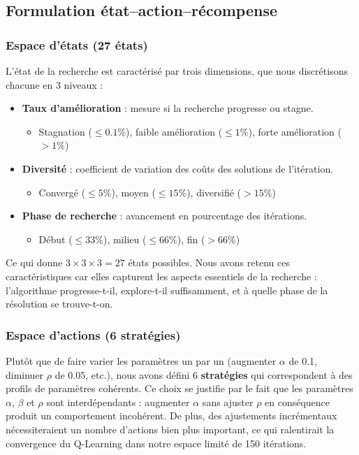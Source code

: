 \documentclass[12pt, a4paper]{article}
\begin{document}
\subsection{Formulation état--action--récompense}

\subsubsection{Espace d'états (27 états)}

L'état de la recherche est caractérisé par trois dimensions, que nous discrétisons chacune en 3 niveaux :

\begin{itemize}
    \item \textbf{Taux d'amélioration} : mesure si la recherche progresse ou stagne.
    \begin{itemize}
        \item Stagnation ($\leq 0.1\%$), faible amélioration ($\leq 1\%$), forte amélioration ($> 1\%$)
    \end{itemize}
    \item \textbf{Diversité} : coefficient de variation des coûts des solutions de l'itération.
    \begin{itemize}
        \item Convergé ($\leq 5\%$), moyen ($\leq 15\%$), diversifié ($> 15\%$)
    \end{itemize}
    \item \textbf{Phase de recherche} : avancement en pourcentage des itérations.
    \begin{itemize}
        \item Début ($\leq 33\%$), milieu ($\leq 66\%$), fin ($> 66\%$)
    \end{itemize}
\end{itemize}

Ce qui donne $3 \times 3 \times 3 = 27$ états possibles. Nous avons retenu ces caractéristiques car elles capturent les aspects essentiels de la recherche : l'algorithme progresse-t-il, explore-t-il suffisamment, et à quelle phase de la résolution se trouve-t-on.

\subsubsection{Espace d'actions (6 stratégies)}

Plutôt que de faire varier les paramètres un par un (augmenter $\alpha$ de 0.1, diminuer $\rho$ de 0.05, etc.), nous avons défini 6 \textbf{stratégies} qui correspondent à des profils de paramètres cohérents. Ce choix se justifie par le fait que les paramètres $\alpha$, $\beta$ et $\rho$ sont interdépendants : augmenter $\alpha$ sans ajuster $\rho$ en conséquence produit un comportement incohérent. De plus, des ajustements incrémentaux nécessiteraient un nombre d'actions bien plus important, ce qui ralentirait la convergence du Q-Learning dans notre espace limité de 150 itérations.
\end{document}
